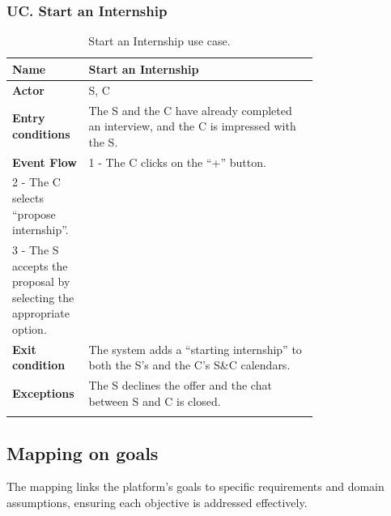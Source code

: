 \subsubsection*{UC\cuc . Start an Internship}
\begin{center}
    \begin{longtable}{|l|p{0.75\linewidth}|}
        \hline
        \textbf{Name}               & Start an Internship\\
        \hline
        \textbf{Actor}              & S, C\\
        \hline
        \textbf{Entry conditions}   & The S and the C have already completed an interview, and the C is impressed with the S.\\
        \hline
        \textbf{Event Flow}         & 
        1 - The C clicks on the “+” button. \\
        2 - The C selects “propose internship”. \\
        3 - The S accepts the proposal by selecting the appropriate option. \\
        \hline
        \textbf{Exit condition}   & The system adds a “starting internship” to both the S’s and the C’s S\&C calendars. \\       
        \hline
        \textbf{Exceptions}       & The S declines the offer and the chat between S and C is closed. \\
        \hline
        \caption{Start an Internship use case.}
        \label{tab: start_internship_use_case}
    \end{longtable}
\end{center}


\subsection{Mapping on goals}
\label{subsec:mapping_on_goals}%

The mapping links the platform's goals to specific
requirements and domain assumptions, ensuring each objective is
addressed effectively.

